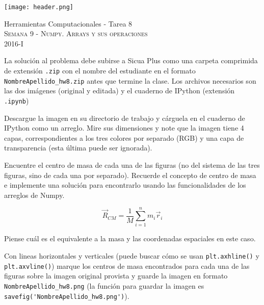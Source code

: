 \documentclass[11pt,letterpaper]{exam}
\begin{document}
\begin{center}

\texttt{[image: header.png]}

\vspace{1.0cm}
{\Large Herramientas Computacionales - Tarea 8} \\
\textsc{Semana 9 - Numpy. Arrays y sus operaciones}\\
2016-I\\
\end{center}



\vspace{0.5cm}

\noindent
La soluci\'on al problema debe subirse a Sicua Plus como una carpeta comprimida de extensi\'on \verb".zip" con el nombre del estudiante en el formato \verb"NombreApellido_hw8.zip" antes que termine la clase. Los archivos necesarios son las dos im\'agenes (original y editada) y el cuaderno de IPython (extensi\'on \verb".ipynb")

\vspace{0.5cm}

\begin{questions}
 

Descargue la imagen en su directorio de trabajo y c\'arguela en el cuaderno de IPython como un arreglo. Mire sus dimensiones y note que la imagen tiene 4 capas, correspondientes a los tres colores por separado (RGB) y una capa de transparencia (esta \'ultima puede ser ignorada).


Encuentre el centro de masa de cada una de las figuras (no del sistema de las tres figuras, sino de cada una por separado). Recuerde el concepto de centro de masa e implemente una soluci\'on para encontrarlo usando las funcionalidades de los arreglos de Numpy.

\begin{equation}
\vec{R}_{CM}=\frac{1}{M}\sum\limits_{i=1}^{n} m_i \vec{r}_i
\end{equation}

Piense cu\'al es el equivalente a la masa y las coordenadas espaciales en este caso.


Con lineas horizontales y verticales (puede buscar c\'omo se usan \verb"plt.axhline()" y \verb"plt.axvline()") marque los centros de masa encontrados para cada una de las figuras sobre la imagen original provista y guarde la imagen en formato \verb"NombreApellido_hw8.png" (la funci\'on para guardar la imagen es \verb"savefig('NombreApellido_hw8.png')").

\end{questions}
\end{document}
